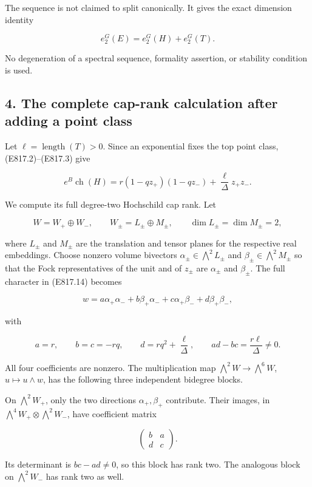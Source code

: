 The sequence is not claimed to split canonically. It gives the exact
dimension identity

\[
 e_2^G(E)=e_2^G(H)+e_2^G(T).
 \tag{E817.13}
\]

No degeneration of a spectral sequence, formality assertion, or
stability condition is used.

\subsection{4. The complete cap-rank calculation after adding a point
class}\label{SF-E817-the-complete-cap-rank-calculation-after-adding-a-point-class}

Let \(\ell=\operatorname{length}(T)>0\). Since an exponential fixes the
top point class, (E817.2)--(E817.3) give

\[
 e^B\operatorname{ch}(H)
   =r(1-qz_+)(1-qz_-)+\frac{\ell}{\Delta}z_+z_-.
 \tag{E817.14}
\]

We compute its full degree-two Hochschild cap rank. Let

\[
 W=W_+\oplus W_-,\qquad
 W_\pm=L_\pm\oplus M_\pm,
 \qquad\dim L_\pm=\dim M_\pm=2,
\]

where \(L_\pm\) and \(M_\pm\) are the translation and tensor planes for
the respective real embeddings. Choose nonzero volume bivectors
\(\alpha_\pm\in\bigwedge^2L_\pm\) and \(\beta_\pm\in\bigwedge^2M_\pm\)
so that the Fock representatives of the unit and of \(z_\pm\) are
\(\alpha_\pm\) and \(\beta_\pm\). The full character in (E817.14)
becomes

\[
 w=a\alpha_+\alpha_-+b\beta_+\alpha_-
       +c\alpha_+\beta_-+d\beta_+\beta_-,
 \tag{E817.15}
\]

with

\[
 a=r,\qquad b=c=-rq,\qquad
 d=rq^2+\frac{\ell}{\Delta},\qquad
 ad-bc=\frac{r\ell}{\Delta}\ne0.
 \tag{E817.16}
\]

All four coefficients are nonzero. The multiplication map
\(\bigwedge^2W\to\bigwedge^6W\), \(u\mapsto u\wedge w\), has the
following three independent bidegree blocks.

On \(\bigwedge^2W_+\), only the two directions \(\alpha_+,\beta_+\)
contribute. Their images, in \(\bigwedge^4W_+\otimes\bigwedge^2W_-\),
have coefficient matrix

\[
 \begin{pmatrix}b&a\\d&c\end{pmatrix}.
\]

Its determinant is \(bc-ad\ne0\), so this block has rank two. The
analogous block on \(\bigwedge^2W_-\) has rank two as well.


